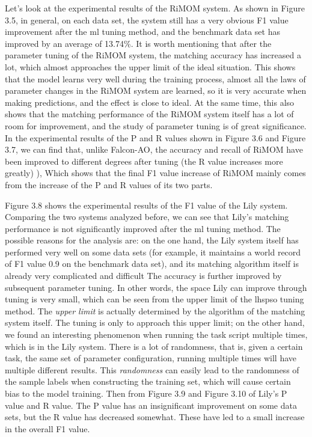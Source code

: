 \documentclass[twoside]{article}
\begin{document}
Let's look at the experimental results of the RiMOM system.
As shown in Figure 3.5, in general, on each data set, the system still has a very obvious F1 value improvement after the ml tuning method, and the benchmark data set has improved by an average of 13.74\%.
It is worth mentioning that after the parameter tuning of the RiMOM system, the matching accuracy has increased a lot, which almost approaches the upper limit of the ideal situation.
This shows that the model learns very well during the training process, almost all the laws of parameter changes in the RiMOM system are learned, so it is very accurate when making predictions, and the effect is close to ideal.
At the same time, this also shows that the matching performance of the RiMOM system itself has a lot of room for improvement, and the study of parameter tuning is of great significance.
In the experimental results of the P and R values shown in Figure 3.6 and Figure 3.7, we can find that, unlike Falcon-AO, the accuracy and recall of RiMOM have been improved to different degrees after tuning (the R value increases more greatly) ), Which shows that the final F1 value increase of RiMOM mainly comes from the increase of the P and R values of its two parts.

Figure 3.8 shows the experimental results of the F1 value of the Lily system.
Comparing the two systems analyzed before, we can see that Lily's matching performance is not significantly improved after the ml tuning method.
The possible reasons for the analysis are: on the one hand, the Lily system itself has performed very well on some data sets (for example, it maintains a world record of F1 value 0.9 on the benchmark data set), and its matching algorithm itself is already very complicated and difficult The accuracy is further improved by subsequent parameter tuning.
In other words, the space Lily can improve through tuning is very small, which can be seen from the upper limit of the lhspso tuning method.
The {\it upper limit} is actually determined by the algorithm of the matching system itself. The tuning is only to approach this upper limit; on the other hand, we found an interesting phenomenon when running the task script multiple times, which is in the Lily system. There is a lot of randomness, that is, given a certain task, the same set of parameter configuration, running multiple times will have multiple different results.
This {\it randomness} can easily lead to the randomness of the sample labels when constructing the training set, which will cause certain bias to the model training.
Then from Figure 3.9 and Figure 3.10 of Lily's P value and R value. The P value has an insignificant improvement on some data sets, but the R value has decreased somewhat. These have led to a small increase in the overall F1 value.
\end{document}
